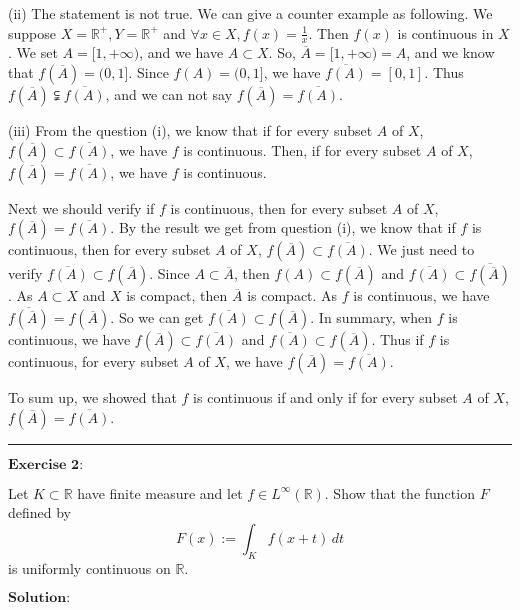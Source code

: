 \documentclass[12pt]{article}
\begin{document}
(ii) The statement is not true. We can give a counter example as following. We suppose $X = \mathbb{R}^{+}, Y = \mathbb{R}^{+}$ and $\forall x \in X, f(x) = \frac{1}{x}$. Then $f(x)$ is continuous in $X$. We set $A = [1, + \infty)$, and we have $A \subset X$. So, $\overline{A} = [1, + \infty) = A$, and we know that $f(\overline{A}) = (0, 1]$. Since $f(A) = (0, 1]$, we have $\overline{f(A)} = [0, 1]$. Thus $f(\overline{A}) \subsetneqq \overline{f(A)}$, and we can not say $f(\overline{A}) = \overline{f(A)}$.

(iii) From the question (i), we know that if for every subset $A$ of $X$, $f(\overline{A}) \subset  \overline{f(A)}$, we have $f$ is continuous. Then, if for every subset $A$ of $X$, $f(\overline{A}) = \overline{f(A)}$, we have $f$ is continuous. 

Next we should verify if $f$ is continuous, then for every subset $A$ of $X$, $f(\overline{A}) = \overline{f(A)}$. By the result we get from question (i), we know that if $f$ is continuous, then for every subset $A$ of $X$, $f(\overline{A}) \subset  \overline{f(A)}$. We just need to verify $\overline{f(A)} \subset  f(\overline{A})$. Since $A \subset \overline{A}$, then $f(A) \subset f(\overline{A})$ and $\overline{f(A)} \subset \overline{f(\overline{A})}$. As $A \subset X$ and $X$ is compact, then $\overline{A}$ is compact. As $f$ is continuous, we have $\overline{f(\overline{A})} = f(\overline{A})$. So we can get $\overline{f(A)} \subset  f(\overline{A})$. In summary, when $f$ is continuous, we have $f(\overline{A}) \subset  \overline{f(A)}$ and $\overline{f(A)} \subset  f(\overline{A})$. Thus if $f$ is continuous, for every subset $A$ of $X$, we have $f(\overline{A}) = \overline{f(A)}$.

To sum up, we showed that $f$ is continuous if and only if for every subset $A$ of $X$, $f(\overline{A}) = \overline{f(A)}$.


\noindent\rule[0.25\baselineskip]{\textwidth}{0.5pt}

\vspace{8pt}
$\textbf{Exercise 2:}$

Let $K \subset \mathbb{R}$ have finite measure and let $f \in L^{\infty} (\mathbb{R})$. Show that the function $F$ defined by 
\begin{equation*}
   F(x):= \int_{K}^{} f(x + t) \, d t
\end{equation*}
is uniformly continuous on $\mathbb{R}$.

\vspace{8pt}
$\textbf{Solution:}$
\end{document}
